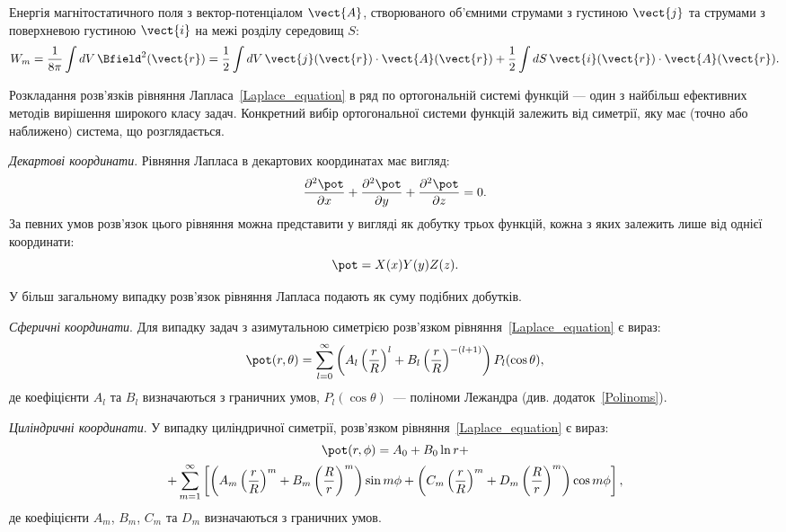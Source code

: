 \begin{Theory}
Енергія магнітостатичного поля з вектор-потенціалом $\vect{A}$, створюваного об’ємними струмами з густиною $\vect{j}$ та струмами з поверхневою  густиною $\vect{i}$  на межі розділу середовищ $S$:
\begin{equation}\label{eq:Wm}
    W_m = \frac{1}{{8\pi }}\int dV \,\Bfield^2(\vect{r}) = \frac{1}{2}\int dV \, \vect{j}(\vect{r}) \cdot \vect{A}(\vect{r}) + \frac{1}{2}\int {dS} \, \vect{i}(\vect{r}) \cdot \vect{A}(\vect{r}).
\end{equation}

    \bigskip

	Розкладання розв'язків рівняння Лапласа~\eqref{Laplace_equation} в ряд по ортогональній системі функцій --- один з найбільш ефективних методів вирішення широкого класу задач. Конкретний вибір ортогональної системи функцій залежить від симетрії, яку має (точно або наближено) система, що розглядається.

	\bigskip\textit{Декартові координати}. Рівняння Лапласа в декартових координатах має вигляд:
	\begin{equation}\label{eq:Laplase_eqn_Cartesian}
		\frac{\partial^2\pot}{\partial x} + \frac{\partial^2\pot}{\partial y} + \frac{\partial^2\pot}{\partial z} = 0.
	\end{equation}
	За певних умов розв'язок цього рівняння можна представити у вигляді як добутку трьох функцій, кожна з яких залежить лише від однієї координати:
	\begin{equation*}
		\pot = X(x)Y(y)Z(z).
	\end{equation*}

	У більш загальному випадку розв'язок рівняння Лапласа подають як суму подібних добутків.


	\bigskip\textit{Сферичні координати}. Для випадку задач з азимутальною симетрією розв'язком рівняння~\eqref{Laplace_equation} є вираз:
	\begin{equation}\label{eq:Laplase_Azimuthal}
		\pot(r, \theta) =  \sum\limits_{l = 0}^{\infty} \left(A_l \left( \frac{r}{R}\right)^l + B_l \left( \frac{r}{R}\right)^{-(l+1)} \right) P_l(\cos\theta) ,
	\end{equation}
	де коефіцієнти $A_l$ та $B_l$ визначаються з граничних умов, $P_l(\cos\theta)$~--- поліноми Лежандра (див. додаток~\ref{Polinoms}).

	\bigskip\textit{Циліндричні координати}. У випадку циліндричної симетрії, розв'язком рівняння~\eqref{Laplace_equation} є вираз:
	\begin{multline}\label{eq:Laplase_Cylindrical}
		\pot(r, \phi) =  A_0 + B_0 \ln r + \\ +\sum\limits_{m = 1}^{\infty} \left[\left(A_m\left( \frac{r}{R}\right)^m + B_m\left( \frac{R}{r}\right)^m\right)\sin m\phi + \left(C_m\left( \frac{r}{R}\right)^m + D_m\left( \frac{R}{r}\right)^m\right)\cos{m\phi} \right],
	\end{multline}
	де коефіцієнти $A_m$, $B_m$, $C_m$ та $D_m$ визначаються з граничних умов.
\end{Theory}


